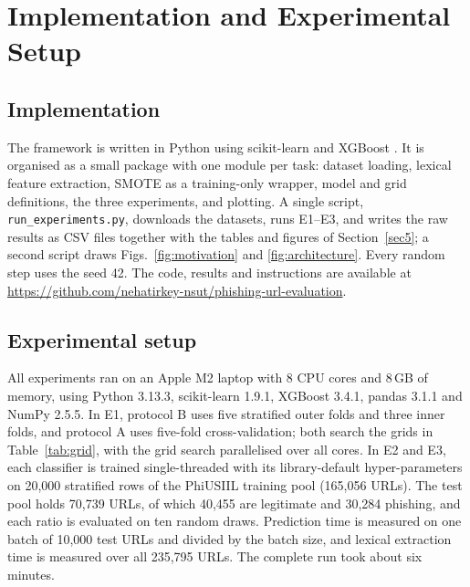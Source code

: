 \documentclass[pdflatex,sn-mathphys-num]{sn-jnl}%
\theoremstyle{thmstyleone}%
\theoremstyle{thmstyletwo}%
\theoremstyle{thmstylethree}%
\begin{document}
\section{Implementation and Experimental Setup}\label{sec4}

\subsection{Implementation}\label{subsec4-1}

The framework is written in Python using scikit-learn \cite{pedregosa2011} and XGBoost \cite{chen2016}. It is organised as a small package with one module per task: dataset loading, lexical feature extraction, SMOTE as a training-only wrapper, model and grid definitions, the three experiments, and plotting. A single script, \texttt{run\_experiments.py}, downloads the datasets, runs E1--E3, and writes the raw results as CSV files together with the tables and figures of Section~\ref{sec5}; a second script draws Figs.~\ref{fig:motivation} and \ref{fig:architecture}. Every random step uses the seed 42. The code, results and instructions are available at \url{https://github.com/nehatirkey-nsut/phishing-url-evaluation}.

\subsection{Experimental setup}\label{subsec4-2}

All experiments ran on an Apple M2 laptop with 8 CPU cores and 8\,GB of memory, using Python 3.13.3, scikit-learn 1.9.1, XGBoost 3.4.1, pandas 3.1.1 and NumPy 2.5.5. In E1, protocol B uses five stratified outer folds and three inner folds, and protocol A uses five-fold cross-validation; both search the grids in Table~\ref{tab:grid}, with the grid search parallelised over all cores. In E2 and E3, each classifier is trained single-threaded with its library-default hyper-parameters on 20,000 stratified rows of the PhiUSIIL training pool (165,056 URLs). The test pool holds 70,739 URLs, of which 40,455 are legitimate and 30,284 phishing, and each ratio is evaluated on ten random draws. Prediction time is measured on one batch of 10,000 test URLs and divided by the batch size, and lexical extraction time is measured over all 235,795 URLs. The complete run took about six minutes.
\end{document}
